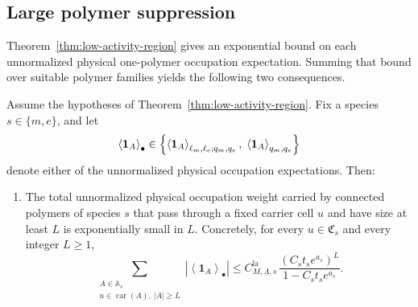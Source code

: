 \subsection{Large polymer suppression}
\label{sec:physical-occupation-tails}

Theorem~\ref{thm:low-activity-region} gives an exponential bound on each unnormalized physical one-polymer occupation expectation. Summing that bound over suitable polymer
families yields the following two consequences.


\begin{corollary}
	\label{cor:physical-occupation-tails}
	Assume the hypotheses of Theorem~\ref{thm:low-activity-region}. Fix a species
	\(s\in\{m,e\}\), and let
	\begin{equation}
		\left\langle \mathbf 1_A \right\rangle_\bullet
		\in
		\Bigl\{
		\left\langle \mathbf 1_A \right\rangle_{\ell_m,\ell_e;q_m,q_e},
		\;
		\left\langle \mathbf 1_A \right\rangle_{q_m,q_e}
		\Bigr\}
	\end{equation}
	denote either of the unnormalized physical occupation expectations. Then:
	\begin{enumerate}[label=(\roman*)]
		\item\label{corItem:large-tail}
		The total unnormalized physical occupation weight carried by connected polymers of
		species \(s\) that pass through a fixed carrier cell \(u\) and have size at least \(L\)
		is exponentially small in \(L\). Concretely, for every
		\(u\in\mathfrak C_s\) and every integer \(L\ge 1\),
		\begin{equation}
			\sum_{\substack{A\in\mathbb A_s\\
					u\in\operatorname{car}(A),\ |A|\ge L}}
			\left|
			\left\langle \mathbf 1_A \right\rangle_\bullet
			\right|
			\le
			C_{M,\underline\Lambda,s}^{\mathrm{la}}\,
			\frac{(C_s t_s e^{a_s})^L}{1-C_s t_s e^{a_s}}.
			\label{eq:physical-tail-bound}
		\end{equation}
		

\end{enumerate}
\end{corollary}
